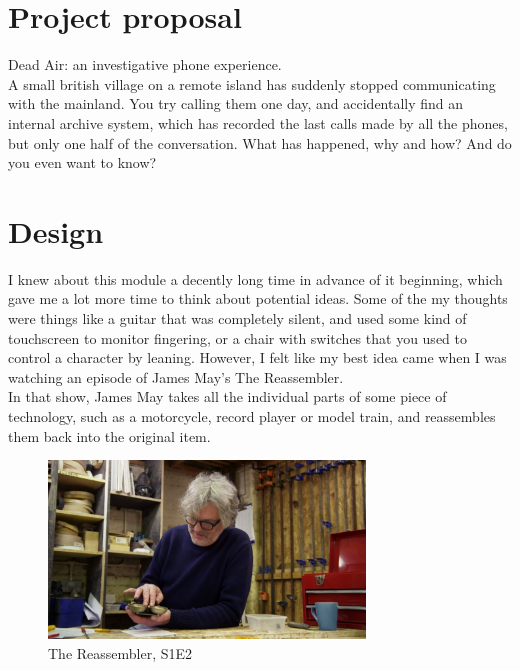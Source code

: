 \documentclass[12pt]{article}
\begin{document}
\maketitle

\section{Project proposal} %
Dead Air: an investigative phone experience.\\
A small british village on a remote island has suddenly stopped communicating with the mainland. 
You try calling them one day, and accidentally find an internal archive system, 
which has recorded the last calls made by all the phones, but only one half of the conversation. 
What has happened, why and how? And do you even want to know?

\FloatBarrier
\section{Design} %
I knew about this module a decently long time in advance of it beginning, 
which gave me a lot more time to think about potential ideas. 
Some of the my thoughts were things like a guitar that was completely silent, 
and used some kind of touchscreen to monitor fingering, 
or a chair with switches that you used to control a character by leaning.
However, I felt like my best idea came when I was watching an episode of James May's The Reassembler.\\
In that show, James May takes all the individual parts of some piece of technology, 
such as a motorcycle, record player or model train, 
and reassembles them back into the original item.\\

\begin{figure}[h]
    \centering
    \includegraphics[width=0.75\textwidth]{TheReassembler}
    \caption{The Reassembler, S1E2}
\end{figure}
\end{document}
